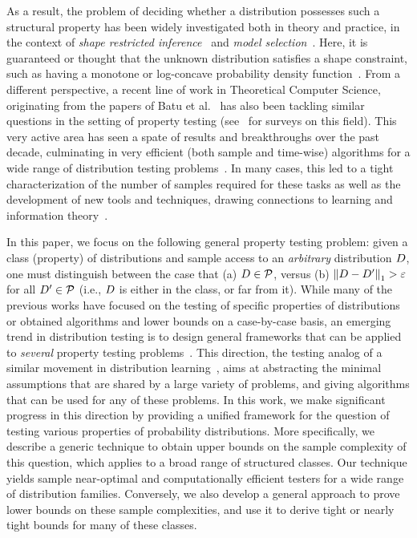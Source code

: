 As a result, the problem of deciding whether a distribution possesses such a structural property has been widely investigated both in theory and practice, in the context of \emph{shape restricted inference}~\cite{BBBB:72,SS:01} and \emph{model selection}~\cite{MP:03}. Here, it is guaranteed or thought that the unknown distribution satisfies a shape constraint, such as having a monotone or log-concave probability density function~\cite{SN:99,BB:05,Wal:09,Diakonikolas:CRC}.
From a different perspective, a recent line of work in Theoretical Computer Science, originating from the papers of Batu et al.~\cite{BFRSW:00,BFFKRW:01,GRexp:00} has also been tackling similar questions in the setting of property testing (see~\cite{Ron:08,Ron:10,Rubinfeld:12:Taming,Canonne:15:BlueData} for surveys on this field). This very active area has seen a spate of results and breakthroughs over the past decade, culminating in very efficient (both sample and time-wise) algorithms for a wide range of distribution testing problems~\cite{BDKR:05,GMV:06,Alon:2007,DDSVV:13,CDVV:14,AD:15,DKN:15}. In many cases, this led to a tight characterization of the number of samples required for these tasks as well as the development of new tools and techniques, drawing connections to learning and information theory~\cite{ValiantValiant:10lb,VV:11:stoc,VV:14,DK:16}.

In this paper, we focus on the following general property testing problem: given a class (property) of distributions \property and sample access to an \emph{arbitrary} distribution $D$, one must distinguish between the case that \textsf{(a)} $D\in\mathcal{P}$, versus \textsf{(b)} ${\lVert D-D^\prime{\rVert}}_1 >\varepsilon$ for all $D^\prime\in\mathcal{P}$ (i.e., $D$ is either in the class, or far from it). While many of the previous works have focused on the testing of specific properties of distributions or obtained algorithms and lower bounds on a case-by-case basis, an emerging trend in distribution testing is to design general frameworks that can be applied to \emph{several} property testing problems~\cite{Valiant:11,VV:11:stoc, DKN:15, DKN:15:FOCS}. This direction, the testing analog of a similar movement in distribution learning~\cite{CDSS:13,CDSS:14:NIPS,CDSS:14,ADLS:15}, aims at abstracting the minimal assumptions that are shared by a large variety of problems, and giving algorithms that can be used for any of these problems. In this work, we make significant progress in this direction by providing a unified framework for the question of testing various properties of probability distributions. More specifically, we describe a generic technique to obtain upper bounds on the sample complexity of this question, which applies to a broad range of structured classes. Our technique yields sample near-optimal and computationally efficient testers for a wide range of distribution families. Conversely, we also develop a general approach to prove lower bounds on these sample complexities, and use it to derive tight or nearly tight bounds for many of these classes.

